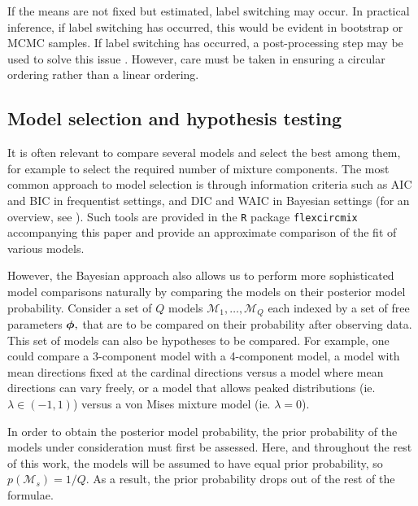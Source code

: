 If the means are not fixed but estimated, label switching may occur. In practical inference, if label switching has occurred, this would be evident in bootstrap or MCMC samples. If label switching has occurred, a post-processing step may be used to solve this issue \citep{Stephens:2000gba, jasra2005markov}. However, care must be taken in ensuring a circular ordering rather than a linear ordering.


\subsection{Model selection and hypothesis testing} \label{modelhyptest}

It is often relevant to compare several models and select the best among them, for example to select the required number of mixture components. The most common approach to model selection is through information criteria such as AIC \citep{akaike1987factor} and BIC \citep{schwarz1978estimating} in frequentist settings, and DIC \citep{spiegelhalter2002bayesian} and WAIC \citep{watanabe2010asymptotic} in Bayesian settings (for an overview, see \citet{WAGENMAKERS200699}). Such tools are provided in the \texttt{R} package \texttt{flexcircmix} accompanying this paper and provide an approximate comparison of the fit of various models.

However, the Bayesian approach also allows us to perform more sophisticated model comparisons naturally by comparing the models on their posterior model probability.  Consider a set of \(Q\) models \(\mathcal{M}_1, \dots, \mathcal{M}_Q\) each indexed by a set of free parameters \(\boldsymbol{\phi},\) that are to be compared on their probability after observing data. This set of models can also be hypotheses to be compared. For example, one could compare a 3-component model with a 4-component model, a model with mean directions fixed at the cardinal directions versus a model where mean directions can vary freely, or a model that allows peaked distributions (ie. \(\lambda \in (-1, 1)\)) versus a von Mises mixture model (ie. \(\lambda = 0\)).

In order to obtain the posterior model probability, the prior probability of the models under consideration must first be assessed. Here, and throughout the rest of this work, the models will be assumed to have equal prior probability, so \(p(\mathcal{M}_s) = 1 / Q.\) As a result, the prior probability drops out of the rest of the formulae.

